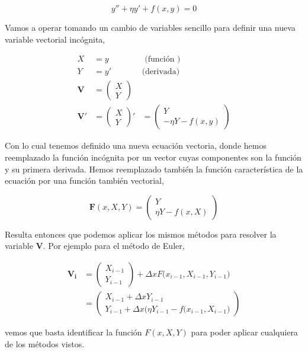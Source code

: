 \begin{equation}
 y'' + \eta y' + f(x, y) = 0
\end{equation}

Vamos a operar tomando un cambio de variables sencillo para definir una nueva variable vectorial 
incógnita, 

\begin{equation}
  \begin{aligned}
    X &= y &\text{ (función ) } \\
    Y &= y' &\text{(derivada) }\\
    \mathbf{V} &= \begin{pmatrix} X \\ Y  \end{pmatrix} \\
      \mathbf{V'} &=  \begin{pmatrix} X \\ Y  \end{pmatrix}' &= 
	\begin{pmatrix}   Y \\	  -\eta Y - f(x, y)  \end{pmatrix}
  \end{aligned}
\end{equation}

Con lo cual tenemos definido una nueva ecuación vectoria, donde hemos reemplazado 
la función incógnita por un vector cuyas componentes son la función y su primera 
derivada. Hemos reemplazado también la función característica de la ecuación por una
función también vectorial, 

\begin{equation}
  \mathbf{F}(x, X, Y) = \begin{pmatrix} Y\\ \eta Y - f(x, X)   \end{pmatrix}
\end{equation}

Resulta entonces que podemos aplicar los mismos métodos para resolver la variable
$\mathbf{V}$. Por ejemplo para el método de Euler, 

\begin{equation}\label{EqnEulerVec}
  \begin{aligned}
    \mathbf{V_i} &= \begin{pmatrix} X_{i-1} \\ Y_{i-1} \end{pmatrix} + 
      \Delta x F\Big( x_{i-1}, X_{i-1}, Y_{i-1} \Big) \\
      {} &= 
      \begin{pmatrix} 
	X_{i-1} + \Delta x Y_{i-1} \\ 
	Y_{i-1} + \Delta x \Big( \eta Y_{i-1} - f(x_{i-1} , X_{i-1}\Big)
      \end{pmatrix}
  \end{aligned}
\end{equation}

vemos que basta identificar la función $F(x, X, Y)$ para poder aplicar cualquiera de los métodos vistos.


